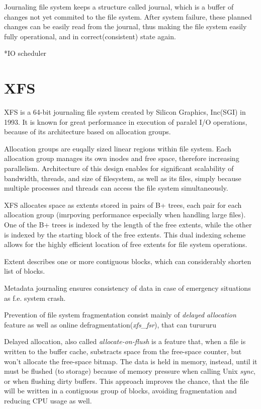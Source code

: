 \documentclass[
  color, %
  table, %
  lof,   %
  lot,   %
]{fithesis3}
\begin{document}
Journaling file system keeps a structure called journal, which is a buffer of changes not yet commited to the file system. After system failure, these planned changes can be easily read from the journal, thus making the file system easily fully operational, and in correct(consistent) state again.

*IO scheduler
\section{XFS}
XFS is a 64-bit journaling file system created by Silicon Graphics, Inc(SGI) in 1993. It is known for great performance in execution of paralel I/O operations, because of its architecture based on allocation groups.

Allocation groups are euqally sized linear regions within file system. Each allocation group manages its own inodes and free space, therefore increasing parallelism.
Architecture of this design enables for significant scalability of bandwidth, threads, and size of filesystem, as well as its files, simply because multiple processes and threads can access the file system simultaneously.

XFS allocates space as extents stored in pairs of B+ trees, each pair for each allocation group (imrpoving performance especially when handling large files). One of the B+ trees is indexed by the length of the free extents, while the other is indexed by the starting block of the free extents. This dual indexing scheme allows for the highly efficient location of free extents for file system operations.

Extent describes one or more contiguous blocks, which can considerably shorten list of blocks.
 
Metadata journaling ensures consistency of data in case of emergency situations as f.e. system crash.

Prevention of file system fragmentation consist mainly of \textit{delayed allocation} feature as well as online defragmentation(\textit{xfs\_fsr}), that can turururu

Delayed allocation, also called \textit{allocate-on-flush} is a feature that, when a file is written to the buffer cache, substracts space from the free-space counter, but won't allocate the free-space bitmap. The data is held in memory, instead, until it must be flushed (to storage) because of memory pressure when calling Unix \textit{sync}, or when flushing dirty buffers. This approach improves the chance, that the file will be written in a contiguous group of blocks, avoiding fragmentation and reducing CPU usage as well.
\end{document}
